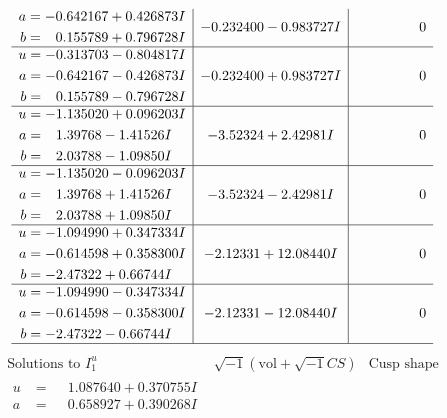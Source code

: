 \documentclass[1p]{elsarticle_modified}
\theoremstyle{definition}
\newcommand{\I}{\sqrt{-1}}
\begin{document}
$$\begin{array}{c|c|c}
\begin{aligned}
a &= -0.642167 + 0.426873 I \\
b &= \phantom{-}0.155789 + 0.796728 I\end{aligned}
 & -0.232400 - 0.983727 I & \phantom{-0.000000 } 0 \\ \hline\begin{aligned}
u &= -0.313703 - 0.804817 I \\
a &= -0.642167 - 0.426873 I \\
b &= \phantom{-}0.155789 - 0.796728 I\end{aligned}
 & -0.232400 + 0.983727 I & \phantom{-0.000000 } 0 \\ \hline\begin{aligned}
u &= -1.135020 + 0.096203 I \\
a &= \phantom{-}1.39768 - 1.41526 I \\
b &= \phantom{-}2.03788 - 1.09850 I\end{aligned}
 & -3.52324 + 2.42981 I & \phantom{-0.000000 } 0 \\ \hline\begin{aligned}
u &= -1.135020 - 0.096203 I \\
a &= \phantom{-}1.39768 + 1.41526 I \\
b &= \phantom{-}2.03788 + 1.09850 I\end{aligned}
 & -3.52324 - 2.42981 I & \phantom{-0.000000 } 0 \\ \hline\begin{aligned}
u &= -1.094990 + 0.347334 I \\
a &= -0.614598 + 0.358300 I \\
b &= -2.47322 + 0.66744 I\end{aligned}
 & -2.12331 + 12.08440 I & \phantom{-0.000000 } 0 \\ \hline\begin{aligned}
u &= -1.094990 - 0.347334 I \\
a &= -0.614598 - 0.358300 I \\
b &= -2.47322 - 0.66744 I\end{aligned}
 & -2.12331 - 12.08440 I & \phantom{-0.000000 } 0\\
 \hline 
 \end{array}$$\newpage$$\begin{array}{c|c|c}  
\text{Solutions to }I^u_{1}& \I (\text{vol} + \sqrt{-1}CS) & \text{Cusp shape}\\
 \hline 
\begin{aligned}
u &= \phantom{-}1.087640 + 0.370755 I \\
a &= \phantom{-}0.658927 + 0.390268 I \\

\end{aligned}
\end{array}$$
\end{document}
